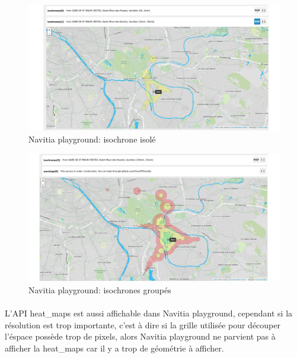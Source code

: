 \documentclass[a4paper]{report}
\begin{document}
\begin{figure}[H]
	\begin{center}
		\includegraphics[width=400pt]{image/n_p_iso}
		\caption{Navitia playground: isochrone isolé}
		\label{Navitia playground: isochrone isolé}
	\end{center}
\end{figure}

\begin{figure}[H]
	\begin{center}
		\includegraphics[width=400pt]{image/n_p_isochrone}
		\caption{Navitia playground: isochrones groupés}
		\label{Navitia playground: isochrones groupés}
	\end{center}
\end{figure}

\paragraph{}L'API heat\_maps est aussi affichable dans Navitia playground, cependant si la résolution est trop importante, c'est à dire si la grille utilisée pour découper l'éspace possède trop de pixels, alors Navitia playground ne parvient pas à afficher la heat\_maps car il y a trop de géométrie à afficher.
\end{document}

